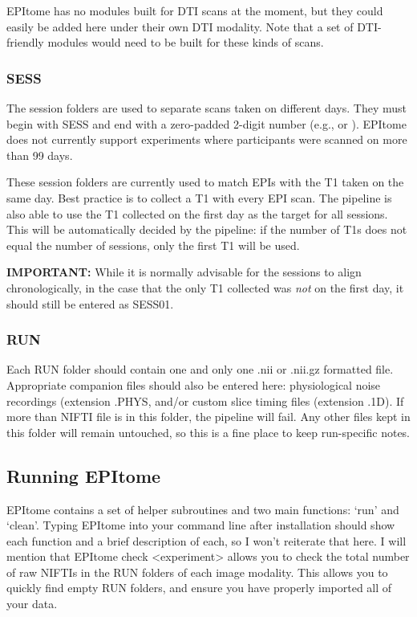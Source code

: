 \documentclass[final,titlepage,letterpaper,oneside,12pt]{article}
\renewcommand{\texttt}[2][BrickRed]{\textcolor{#1}{\ttfamily #2}}%
\begin{document}
EPItome has no modules built for DTI scans at the moment, but they could easily be added here under their own DTI modality. Note that a set of DTI-friendly modules would need to be built for these kinds of scans.

\subsubsection{SESS}

The session folders are used to separate scans taken on different days. They must begin with \texttt{SESS} and end with a zero-padded 2-digit number (e.g., \texttt{02} or \texttt{10}). EPItome does not currently support experiments where participants were scanned on more than 99 days.

These session folders are currently used to match EPIs with the T1 taken on the same day. Best practice is to collect a T1 with every EPI scan. The pipeline is also able to use the T1 collected on the first day as the target for all sessions. This will be automatically decided by the pipeline: if the number of T1s does not equal the number of sessions, only the first T1 will be used.

\textbf{IMPORTANT:} While it is normally advisable for the sessions to align chronologically, in the case that the only T1 collected was \textit{not} on the first day, it should still be entered as \texttt{SESS01}.

\subsubsection{RUN}

Each \texttt{RUN} folder should contain one and only one \texttt{.nii} or \texttt{.nii.gz} formatted file. Appropriate companion files should also be entered here: physiological noise recordings (extension \texttt{.PHYS}, and/or custom slice timing files (extension \texttt{.1D}). If more than NIFTI file is in this folder, the pipeline will fail. Any other files kept in this folder will remain untouched, so this is a fine place to keep run-specific notes.

\subsection{Running EPItome}

\texttt{EPItome} contains a set of helper subroutines and two main functions: `run' and `clean'. Typing \texttt{EPItome} into your command line after installation should show each function and a brief description of each, so I won't reiterate that here. I will mention that \texttt{EPItome check <experiment>} allows you to check the total number of raw NIFTIs in the \texttt{RUN} folders of each image modality. This allows you to quickly find empty \texttt{RUN} folders, and ensure you have properly imported all of your data.
\end{document}
